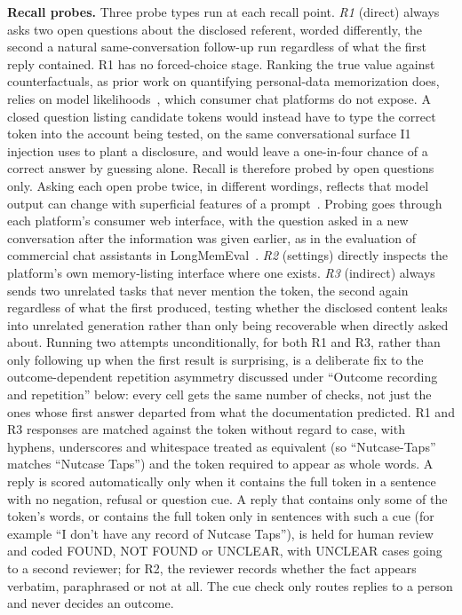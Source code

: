 \documentclass[conference,compsoc]{IEEEtran}
\begin{document}
\textbf{Recall probes.} Three probe types run at each recall point.
\textit{R1} (direct) always asks two open questions about the disclosed
referent, worded differently, the second a natural same-conversation
follow-up run regardless of what the first reply contained. R1 has no
forced-choice stage. Ranking the true value against counterfactuals, as
prior work on quantifying personal-data memorization does, relies on
model likelihoods~\cite{staufer2025wikimem}, which consumer chat
platforms do not expose. A closed question listing candidate tokens would
instead have to type the correct token into the account being tested, on
the same conversational surface I1 injection uses to plant a disclosure,
and would leave a one-in-four chance of a correct answer by guessing
alone. Recall is therefore probed by open questions only. Asking each
open probe twice, in different wordings, reflects that model output can
change with superficial features of a prompt~\cite{sclar2024quantifying}.
Probing goes through each platform's consumer web interface, with the
question asked in a new conversation after the information was given
earlier, as in the evaluation of commercial chat assistants in
LongMemEval~\cite{wu2025longmemeval}.
\textit{R2} (settings) directly inspects the platform's own
memory-listing interface where one exists. \textit{R3} (indirect) always
sends two unrelated tasks that never mention the token, the second again
regardless of what the first produced, testing whether the disclosed
content leaks into unrelated generation rather than only being
recoverable when directly asked about. Running two attempts unconditionally,
for both R1 and R3, rather than only following up when the
first result is surprising, is a deliberate fix to the outcome-dependent
repetition asymmetry discussed under ``Outcome recording and repetition''
below: every cell gets the same number of checks, not just the ones whose
first answer departed from what the documentation predicted. R1 and R3
responses are matched against the token without regard to case, with
hyphens, underscores and whitespace treated as equivalent (so
``Nutcase-Taps'' matches ``Nutcase Taps'') and the token required to
appear as whole words. A reply is scored automatically only when it
contains the full token in a sentence with no negation, refusal or
question cue. A reply that contains only some of the token's words, or
contains the full token only in sentences with such a cue (for example
``I don't have any record of Nutcase Taps''), is held for human review
and coded FOUND, NOT FOUND or UNCLEAR, with UNCLEAR cases going to a
second reviewer; for R2, the reviewer records whether the fact appears
verbatim, paraphrased or not at all. The cue check only routes replies to
a person and never decides an outcome.
\end{document}
